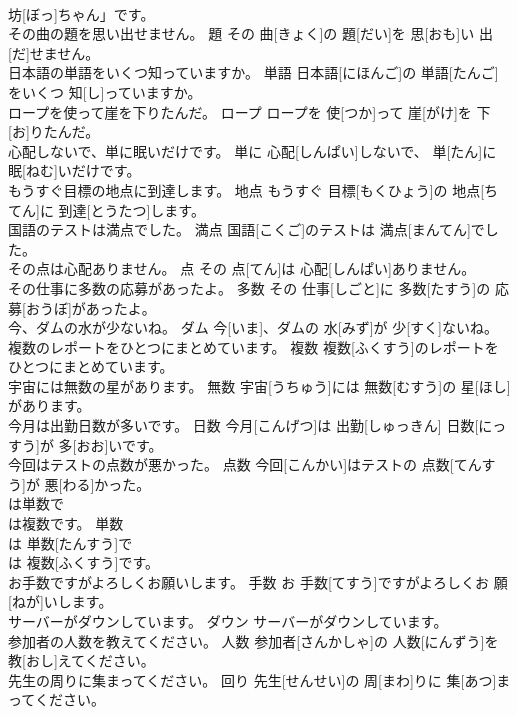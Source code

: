 \documentclass[8pt]{extreport}
\begin{document}
\begin{CJK}{UTF8}{min}
\\	坊[ぼっ]ちゃん」です。	
\\	その曲の題を思い出せません。	題	その 曲[きょく]の 題[だい]を 思[おも]い 出[だ]せません。	
\\	日本語の単語をいくつ知っていますか。	単語	日本語[にほんご]の 単語[たんご]をいくつ 知[し]っていますか。	
\\	ロープを使って崖を下りたんだ。	ロープ	ロープを 使[つか]って 崖[がけ]を 下[お]りたんだ。	
\\	心配しないで、単に眠いだけです。	単に	心配[しんぱい]しないで、 単[たん]に 眠[ねむ]いだけです。	
\\	もうすぐ目標の地点に到達します。	地点	もうすぐ 目標[もくひょう]の 地点[ちてん]に 到達[とうたつ]します。	
\\	国語のテストは満点でした。	満点	国語[こくご]のテストは 満点[まんてん]でした。	
\\	その点は心配ありません。	点	その 点[てん]は 心配[しんぱい]ありません。	
\\	その仕事に多数の応募があったよ。	多数	その 仕事[しごと]に 多数[たすう]の 応募[おうぼ]があったよ。	
\\	今、ダムの水が少ないね。	ダム	今[いま]、ダムの 水[みず]が 少[すく]ないね。	
\\	複数のレポートをひとつにまとめています。	複数	複数[ふくすう]のレポートをひとつにまとめています。	
\\	宇宙には無数の星があります。	無数	宇宙[うちゅう]には 無数[むすう]の 星[ほし]があります。	
\\	今月は出勤日数が多いです。	日数	今月[こんげつ]は 出勤[しゅっきん] 日数[にっすう]が 多[おお]いです。	
\\	今回はテストの点数が悪かった。	点数	今回[こんかい]はテストの 点数[てんすう]が 悪[わる]かった。	
\\	は単数で
\\	は複数です。	単数	
\\	[ぺん]は 単数[たんすう]で 
\\	[ぺんず]は 複数[ふくすう]です。	
\\	お手数ですがよろしくお願いします。	手数	お 手数[てすう]ですがよろしくお 願[ねが]いします。	
\\	サーバーがダウンしています。	ダウン	サーバーがダウンしています。	
\\	参加者の人数を教えてください。	人数	参加者[さんかしゃ]の 人数[にんずう]を 教[おし]えてください。	
\\	先生の周りに集まってください。	回り	先生[せんせい]の 周[まわ]りに 集[あつ]まってください。	

\end{CJK}
\end{document}

